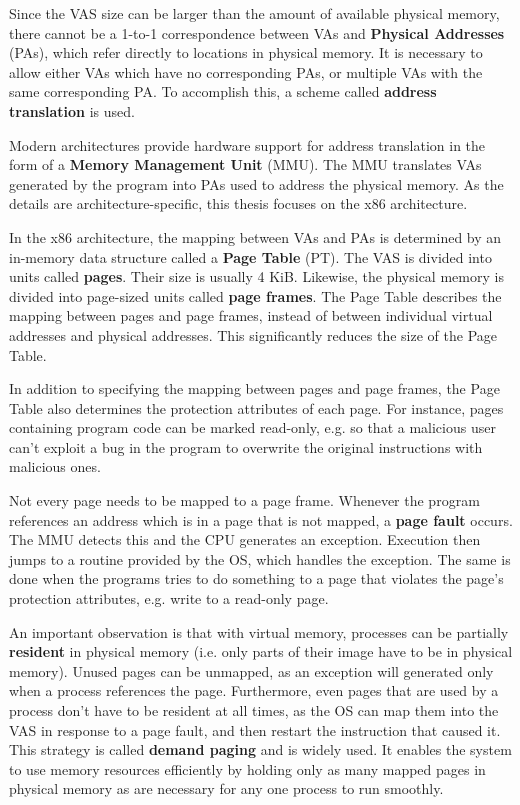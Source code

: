\documentclass[shortabstract, english]{iithesis}
\begin{document}
Since the VAS size can be larger than the amount of available physical memory,
there cannot be a 1-to-1 correspondence between VAs and \textbf{Physical
  Addresses} (PAs), which refer directly to locations in physical memory. It is
necessary to allow either VAs which have no corresponding PAs, or multiple VAs
with the same corresponding PA. To accomplish this, a scheme called
\textbf{address translation} is used.

Modern architectures provide hardware support for address translation in the
form of a \textbf{Memory Management Unit} (MMU). The MMU translates VAs
generated by the program into PAs used to address the physical memory. As the
details are architecture-specific, this thesis focuses on the x86 architecture.

In the x86 architecture, the mapping between VAs and PAs is determined by an
in-memory data structure called a \textbf{Page Table} (PT). The VAS is divided
into units called \textbf{pages}. Their size is usually 4 KiB. Likewise, the
physical memory is divided into page-sized units called \textbf{page frames}.
The Page Table describes the mapping between pages and page frames, instead of
between individual virtual addresses and physical addresses. This significantly
reduces the size of the Page Table.

In addition to specifying the mapping between pages and page frames, the Page
Table also determines the protection attributes of each page. For instance,
pages containing program code can be marked read-only, e.g. so that a malicious
user can't exploit a bug in the program to overwrite the original instructions
with malicious ones.

Not every page needs to be mapped to a page frame. Whenever the program
references an address which is in a page that is not mapped, a \textbf{page
  fault} occurs. The MMU detects this and the CPU generates an exception.
Execution then jumps to a routine provided by the OS, which handles the
exception. The same is done when the programs tries to do something to a page
that violates the page's protection attributes, e.g. write to a read-only page.

An important observation is that with virtual memory, processes can be partially
\textbf{resident} in physical memory (i.e. only parts of their image have to be
in physical memory). Unused pages can be unmapped, as an exception will
generated only when a process references the page. Furthermore, even pages that
are used by a process don't have to be resident at all times, as the OS can map
them into the VAS in response to a page fault, and then restart the
instruction that caused it. This strategy is called \textbf{demand paging} and
is widely used. It enables the system to use memory resources efficiently
by holding only as many mapped pages in physical memory as are necessary for
any one process to run smoothly.
\end{document}
